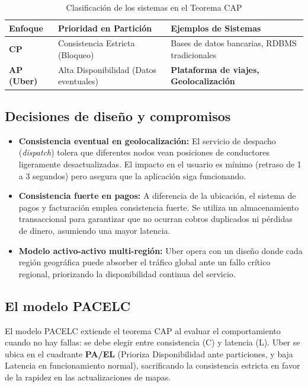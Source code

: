 \documentclass[12pt,a4paper]{article}
\begin{document}
\begin{table}[ht]
  \centering
  \caption{Clasificación de los sistemas en el Teorema CAP}
  \label{tab:cap_comparativa}
  \small
  \vspace{0.2cm}
  \begin{tabular}{lll}
    \toprule
    \textbf{Enfoque} & \textbf{Prioridad en Partición} & \textbf{Ejemplos de Sistemas} \\
    \midrule
    \textbf{CP} & Consistencia Estricta (Bloqueo) & Bases de datos bancarias, RDBMS tradicionales \\
    \textbf{AP (Uber)} & Alta Disponibilidad (Datos eventuales) & \textbf{Plataforma de viajes, Geolocalización} \\
    \bottomrule
  \end{tabular}
\end{table}

\subsection{Decisiones de diseño y compromisos}

\begin{itemize}
  \item \textbf{Consistencia eventual en geolocalización:} El servicio de despacho (\textit{dispatch}) tolera que diferentes nodos vean posiciones de conductores ligeramente desactualizadas. El impacto en el usuario es mínimo (retraso de 1 a 3 segundos) pero asegura que la aplicación siga funcionando.
  \item \textbf{Consistencia fuerte en pagos:} A diferencia de la ubicación, el sistema de pagos y facturación emplea consistencia fuerte. Se utiliza un almacenamiento transaccional para garantizar que no ocurran cobros duplicados ni pérdidas de dinero, asumiendo una mayor latencia.
  \item \textbf{Modelo activo-activo multi-región:} Uber opera con un diseño donde cada región geográfica puede absorber el tráfico global ante un fallo crítico regional, priorizando la disponibilidad continua del servicio.
\end{itemize}

\subsection{El modelo PACELC}
El modelo PACELC extiende el teorema CAP al evaluar el comportamiento cuando no hay fallas: se debe elegir entre consistencia (C) y latencia (L). Uber se ubica en el cuadrante \textbf{PA/EL} (Prioriza Disponibilidad ante particiones, y baja Latencia en funcionamiento normal), sacrificando la consistencia estricta en favor de la rapidez en las actualizaciones de mapas.
\end{document}
